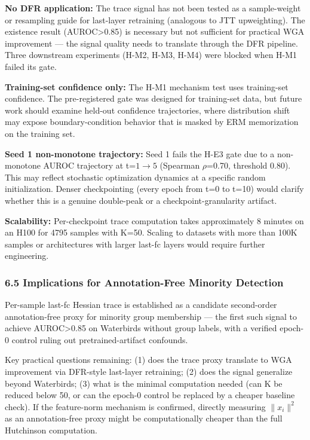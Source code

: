 \textbf{No DFR application:} The trace signal has not been tested as a sample-weight or resampling guide for last-layer retraining (analogous to JTT upweighting). The existence result (AUROC>0.85) is necessary but not sufficient for practical WGA improvement --- the signal quality needs to translate through the DFR pipeline. Three downstream experiments (H-M2, H-M3, H-M4) were blocked when H-M1 failed its gate.

\textbf{Training-set confidence only:} The H-M1 mechanism test uses training-set confidence. The pre-registered gate was designed for training-set data, but future work should examine held-out confidence trajectories, where distribution shift may expose boundary-condition behavior that is masked by ERM memorization on the training set.

\textbf{Seed 1 non-monotone trajectory:} Seed 1 fails the H-E3 gate due to a non-monotone AUROC trajectory at t=$1\rightarrow 5$ (Spearman $\rho$=0.70, threshold 0.80). This may reflect stochastic optimization dynamics at a specific random initialization. Denser checkpointing (every epoch from t=0 to t=10) would clarify whether this is a genuine double-peak or a checkpoint-granularity artifact.

\textbf{Scalability:} Per-checkpoint trace computation takes approximately 8 minutes on an H100 for 4795 samples with K=50. Scaling to datasets with more than 100K samples or architectures with larger last-fc layers would require further engineering.

\subsubsection{6.5 Implications for Annotation-Free Minority Detection}

Per-sample last-fc Hessian trace is established as a candidate second-order annotation-free proxy for minority group membership --- the first such signal to achieve AUROC>0.85 on Waterbirds without group labels, with a verified epoch-0 control ruling out pretrained-artifact confounds.

Key practical questions remaining: (1) does the trace proxy translate to WGA improvement via DFR-style last-layer retraining; (2) does the signal generalize beyond Waterbirds; (3) what is the minimal computation needed (can K be reduced below 50, or can the epoch-0 control be replaced by a cheaper baseline check). If the feature-norm mechanism is confirmed, directly measuring $\|x_{i}\|^2$ as an annotation-free proxy might be computationally cheaper than the full Hutchinson computation.
